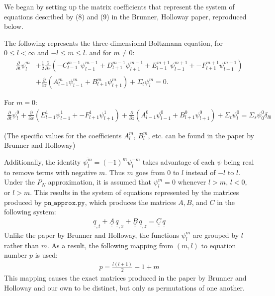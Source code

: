 \documentclass[12pt]{article}
\newcommand{\bunderline}[1]{\underline{#1}}
\renewcommand{\vec}[1]{{\bunderline{#1}}}
\newcommand{\mat}[1]{{\bunderline{\bunderline{#1}}}}
\begin{document}
We began by setting up the matrix coefficients that represent the system of equations described by (8) and (9) in the Brunner, Holloway paper, reproduced below.

The following represents the three-dimensional Boltzmann equation, for $0 \leq l < \infty$ and $-l \leq m \leq l$.
and for $m \neq 0$:
\begin{align*}
	\frac{\partial}{\partial t}\psi_{l}^{m} &+ \frac{1}{2}\frac{\partial}{\partial x}
	(
	-C_{l-1}^{m-1}\psi_{l-1}^{m-1} + 
	D_{l+1}^{m-1}\psi_{l+1}^{m-1} + 
	E_{l-1}^{m+1}\psi_{l-1}^{m+1} + 
	-F_{l+1}^{m+1}\psi_{l+1}^{m+1} 
	)\\ &+ 
	\frac{\partial}{\partial z}
	(
	A_{l-1}^{m}\psi_{l-1}^{m} + 
	B_{l+1}^{m}\psi_{l+1}^{m}
	) + \Sigma_t\psi^{m}_{l} = 0.
\end{align*}

For $m = 0$:
\begin{align*}
	\frac{\partial}{\partial t}\psi_{l}^0 + 
	\frac{\partial}{\partial x}
	(
	E_{l-1}^{1}\psi_{l-1}^{1} + 
	-F_{l+1}^{1}\psi_{l+1}^{1} 
	) +  
	\frac{\partial}{\partial z}
	(
	A_{l-1}^{0}\psi_{l-1}^{0} + 
	B_{l+1}^{0}\psi_{l+1}^{0}
	) + \Sigma_t\psi^0_{l} = \Sigma_s\psi^0_0\delta_{l0}
\end{align*}

(The specific values for the coefficients $A_l^m$, $B_l^m$, etc. can be found in the paper by Brunner and Holloway)

Additionally, the identity $\bar{\psi_l^m} = (-1)^m\psi_l^{-m}$ takes advantage of each $\psi$ being real to remove terms with negative $m$.
Thus $m$ goes from $0$ to $l$ instead of $-l$ to $l$.
Under the $P_N$ approximation, it is assumed that $\psi_l^m = 0$ whenever $l > m$, $l < 0$, or $l > m$.
This results in the system of equations represented by the matrices produced by $\texttt{pn\_approx.py}$, which produces the matrices $A, B$, and $C$ in the following system:
\begin{align*}
	\vec{q}_{,t} + \mat{A}\,\vec{q}_{,x} + \mat{B}\,\vec{q}_{,z} = \mat{C}\,\vec{q}
\end{align*}
Unlike the paper by Brunner and Holloway, the functions $\psi_l^m$ are grouped by $l$ rather than $m$.
As a result, the following mapping from $(m, l)$ to equation number $p$ is used:
\begin{align*}
	p = \frac{l(l+1)}{2} + 1 + m
\end{align*}
This mapping causes the exact matrices produced in the paper by Brunner and Holloway and our own to be distinct, but only as permutations of one another.
\end{document}

